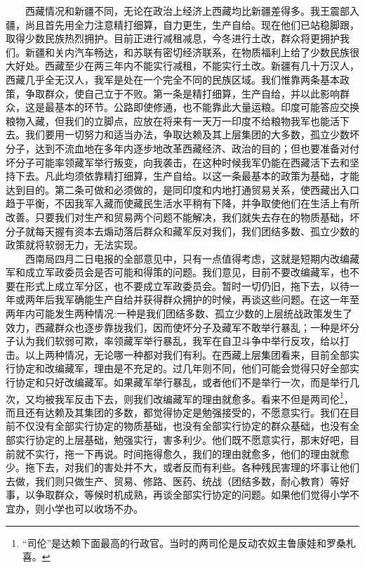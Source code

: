 \documentclass[cn,11pt,chinese]{elegantbook}
\begin{document}
　　西藏情况和新疆不同，无论在政治上经济上西藏均比新疆差得多。我王震部入疆，尚且首先用全力注意精打细算，自力更生，生产自给。现在他们已站稳脚跟，取得少数民族热烈拥护。目前正进行减租减息，今冬进行土改，群众将更拥护我们。新疆和关内汽车畅达，和苏联有密切经济联系，在物质福利上给了少数民族很大好处。西藏至少在两三年内不能实行减租，不能实行土改。新疆有几十万汉人，西藏几乎全无汉人，我军是处在一个完全不同的民族区域。我们惟靠两条基本政策，争取群众，使自己立于不败。第一条是精打细算，生产自给，并以此影响群众，这是最基本的环节。公路即使修通，也不能靠此大量运粮。印度可能答应交换粮物入藏，但我们的立脚点，应放在将来有一天万一印度不给粮物我军也能活下去。我们要用一切努力和适当办法，争取达赖及其上层集团的大多数，孤立少数坏分子，达到不流血地在多年内逐步地改革西藏经济、政治的目的；但也要准备对付坏分子可能率领藏军举行叛变，向我袭击，在这种时候我军仍能在西藏活下去和坚持下去。凡此均须依靠精打细算，生产自给。以这一条最基本的政策为基础，才能达到目的。第二条可做和必须做的，是同印度和内地打通贸易关系，使西藏出入口趋于平衡，不因我军入藏而使藏民生活水平稍有下降，并争取使他们在生活上有所改善。只要我们对生产和贸易两个问题不能解决，我们就失去存在的物质基础，坏分子就每天握有资本去煽动落后群众和藏军反对我们，我们团结多数、孤立少数的政策就将软弱无力，无法实现。\\
　　西南局四月二日电报的全部意见中，只有一点值得考虑，这就是短期内改编藏军和成立军政委员会是否可能和得策的问题。我们意见，目前不要改编藏军，也不要在形式上成立军分区，也不要成立军政委员会。暂时一切仍旧，拖下去，以待一年或两年后我军确能生产自给并获得群众拥护的时候，再谈这些问题。在这一年至两年内可能发生两种情况:一种是我们团结多数、孤立少数的上层统战政策发生了效力，西藏群众也逐步靠拢我们，因而使坏分子及藏军不敢举行暴乱；一种是坏分子认为我们软弱可欺，率领藏军举行暴乱，我军在自卫斗争中举行反攻，给以打击。以上两种情况，无论哪一种都对我们有利。在西藏上层集团看来，目前全部实行协定和改编藏军，理由是不充足的。过几年则不同，他们可能会觉得只好全部实行协定和只好改编藏军。如果藏军举行暴乱，或者他们不是举行一次，而是举行几次，又均被我军反击下去，则我们改编藏军的理由就愈多。看来不但是两司伦\footnote[1]{“司伦”是达赖下面最高的行政官。当时的两司伦是反动农奴主鲁康娃和罗桑札喜。}，而且还有达赖及其集团的多数，都觉得协定是勉强接受的，不愿意实行。我们在目前不仅没有全部实行协定的物质基础，也没有全部实行协定的群众基础，也没有全部实行协定的上层基础，勉强实行，害多利少。他们既不愿意实行，那末好吧，目前就不实行，拖一下再说。时间拖得愈久，我们的理由就愈多，他们的理由就愈少。拖下去，对我们的害处并不大，或者反而有利些。各种残民害理的坏事让他们去做，我们则只做生产、贸易、修路、医药、统战（团结多数，耐心教育）等好事，以争取群众，等候时机成熟，再谈全部实行协定的问题。如果他们觉得小学不宜办，则小学也可以收场不办。\\
\end{document}
